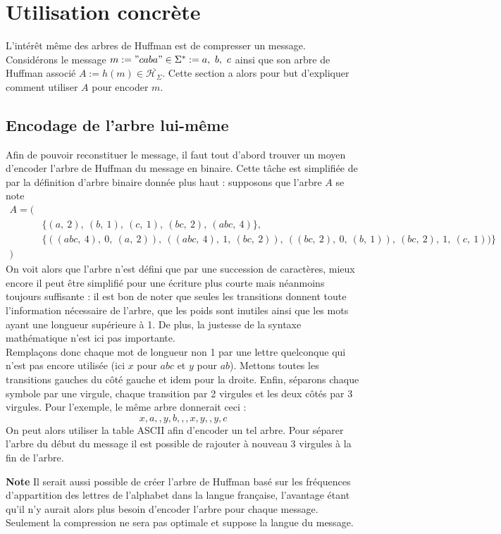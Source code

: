 \documentclass[a4paper, 12pt]{article}
\begin{document}
\newpage

\section{Utilisation concrète}
L'intérêt même des arbres de Huffman est de compresser un message. Considérons le message $m := "caba" \in\Sigma^* := {a,\ b,\ c}$ ainsi que son arbre de Huffman associé $A:=h(m)\in\overline{\mathcal{H}_\Sigma}$. Cette section a alors pour but d'expliquer comment utiliser $A$ pour encoder $m$.

\subsection{Encodage de l'arbre lui-même}
Afin de pouvoir reconstituer le message, il faut tout d'abord trouver un moyen d'encoder l'arbre de Huffman du message en binaire. Cette tâche est simplifiée de par la définition d'arbre binaire donnée plus haut : supposons que l'arbre $A$ se note
\begin{align*}
A = (& \\
	&\{(a,\ 2),\ (b,\ 1),\ (c,\ 1),\ (bc,\ 2),\ (abc,\ 4)\}, \\
	&\{((abc,\ 4),\ 0,\ (a,\ 2)),\ ((abc,\ 4),\ 1,\ (bc,\ 2)),\ ((bc,\ 2),\ 0,\ (b,\ 1)),\ (bc,\ 2),\ 1,\ (c,\ 1))\} \\
)&
\end{align*}
On voit alors que l'arbre n'est défini que par une succession de caractères, mieux encore il peut être simplifié pour une écriture plus courte mais néanmoins toujours suffisante :
il est bon de noter que seules les transitions donnent toute l'information nécessaire de l'arbre, que les poids sont inutiles ainsi que les mots ayant une longueur supérieure à 1. De plus, la justesse de la syntaxe mathématique n'est ici pas importante. \\
Remplaçons donc chaque mot de longueur non 1 par une lettre quelconque qui n'est pas encore utilisée (ici $x$ pour $abc$ et $y$ pour $ab$). Mettons toutes les transitions gauches du côté gauche et idem pour la droite. Enfin, séparons chaque symbole par une virgule, chaque transition par 2 virgules et les deux côtés par 3 virgules. Pour l'exemple, le même arbre donnerait ceci :
$$
x,a,,y,b,,,x,y,,y,c
$$
On peut alors utiliser la table ASCII afin d'encoder un tel arbre. Pour séparer l'arbre du début du message il est possible de rajouter à nouveau 3 virgules à la fin de l'arbre.

\textbf{Note}
Il serait aussi possible de créer l'arbre de Huffman basé sur les fréquences d'appartition des lettres de l'alphabet dans la langue française, l'avantage étant qu'il n'y aurait alors plus besoin d'encoder l'arbre pour chaque message. Seulement la compression ne sera pas optimale et suppose la langue du message.
\end{document}
